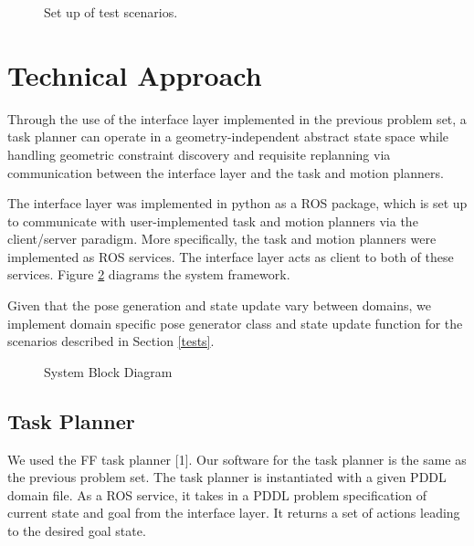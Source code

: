 \documentclass[12pt]{article}
\begin{document}
\begin{figure}[h]
\centering
\def\svgwidth{.4\textwidth}

\caption{Set up of test scenarios.\label{fig:scenarios}}
\end{figure}

\section{Technical Approach}
Through the use of the interface layer implemented in the previous problem set, a task planner can operate in a geometry-independent abstract state space while handling geometric constraint discovery and requisite replanning via communication between the interface layer and the task and motion planners. 

The interface layer was implemented in python as a ROS package, which is set up to communicate with user-implemented task and motion planners via the client/server paradigm. 
More specifically, the task and motion planners were implemented as ROS services. 
The interface layer acts as client to both of these services. 
Figure \ref{fig:blockDiagram} diagrams the system framework.

Given that the pose generation and state update vary between domains, we implement domain specific pose generator class and state update function for the scenarios described in Section \ref{tests}.


\begin{figure}[h]
\centering
\def\svgwidth{0.7\textwidth}

\caption{System Block Diagram\label{fig:blockDiagram}}
\end{figure}

\subsection{Task Planner}
We used the FF task planner [1]. 
Our software for the task planner is the same as the previous problem set. 
The task planner is instantiated with a given PDDL domain file.  
As a ROS service, it takes in a PDDL problem specification of current state and goal from the interface layer. 
It returns a set of actions leading to the desired goal state. 
\end{document}
